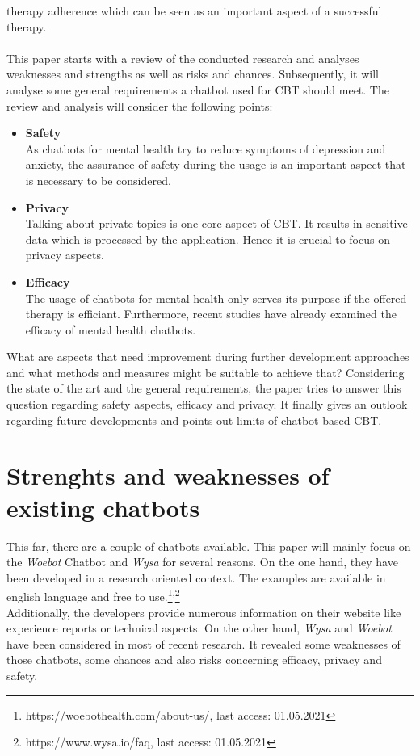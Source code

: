 \documentclass[sigconf, nonacm]{acmart}
\begin{document}
therapy adherence which can be seen as an important aspect of a successful therapy.\cite{Suganuma2018} 
\\\\
This paper starts with a review of the conducted research and analyses weaknesses and strengths as well as risks and chances. 
Subsequently, it will analyse some general requirements a chatbot used for CBT should meet.
The review and analysis will consider the following points:
\\
\begin{itemize}
  \item{\textbf{Safety}}\\
  As chatbots for mental health try to reduce symptoms of depression and anxiety, the assurance of safety during the usage is an important aspect that is necessary to be considered.
  \\
  \item{\textbf{Privacy}}\\
  Talking about private topics is one core aspect of CBT. It results in sensitive data which is processed by the application. Hence it is crucial to focus on privacy aspects.
  \\
  \item{\textbf{Efficacy}}\\
  The usage of chatbots for mental health only serves its purpose if the offered therapy is efficiant. Furthermore, recent studies have already examined the efficacy of mental health chatbots.\cite{Fitzpatrick2017,Inkster}
  \\
\end{itemize}
What are aspects that need improvement during further development approaches and what methods and measures might be suitable to achieve that? 
Considering the state of the art and the general requirements, the paper tries to answer this question regarding safety aspects, efficacy and privacy.
It finally gives an outlook regarding future developments and points out limits of chatbot based CBT.


\section{Strenghts and weaknesses of existing chatbots}
\label{sec:two}
This far, there are a couple of chatbots available. This paper will mainly focus on the \emph{Woebot} Chatbot and \emph{Wysa} for several reasons.
On the one hand, they have been developed in a research oriented context. 
The examples are available in english language and free to use.\footnote{https://woebothealth.com/about-us/, last access: 01.05.2021}\textsuperscript{,}\footnote{https://www.wysa.io/faq, last access: 01.05.2021}
\\
Additionally, the developers provide numerous information on their website
like experience reports or technical aspects.
On the other hand, \emph{Wysa} and \emph{Woebot} have been considered in most of recent research.
It revealed some weaknesses of those chatbots, some chances and also risks concerning efficacy, privacy and safety.
\end{document}
